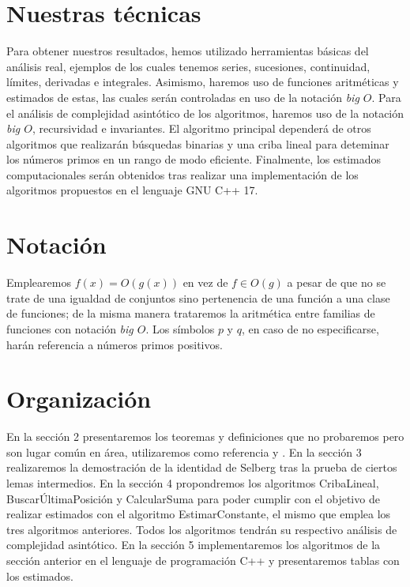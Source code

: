 \section{Nuestras t\'ecnicas}
Para obtener nuestros resultados,
hemos utilizado herramientas b\'asicas del an\'alisis real,
ejemplos de los cuales tenemos series, sucesiones, continuidad,
l\'imites, derivadas e integrales.
Asimismo, haremos uso de funciones aritm\'eticas
y estimados de estas,
las cuales ser\'an controladas en uso de la notaci\'on \textit{big \(O\)}.
Para el an\'alisis de complejidad asint\'otico de los algoritmos,
haremos uso de la notaci\'on \textit{big \(O\)}, recursividad e invariantes.
El algoritmo principal depender\'a de otros algoritmos que realizar\'an
b\'usquedas binarias y una criba lineal para deteminar
los n\'umeros primos en un rango de modo eficiente.
Finalmente, los estimados computacionales ser\'an obtenidos tras realizar una
implementaci\'on de los algoritmos propuestos en el lenguaje GNU C++ 17.

\section{Notaci\'on}
Emplearemos \(f(x) = O(g(x))\) en vez de \(f \in O(g)\)
a pesar de que no se trate de una igualdad de conjuntos sino
pertenencia de una funci\'on a una clase de funciones; 
de la misma manera
trataremos la aritm\'etica entre familias de funciones
con notaci\'on \textit{big \(O\)}.
Los s\'imbolos \(p\) y \(q\), en caso de no especificarse,
har\'an referencia a n\'umeros primos positivos.

\section{Organizaci\'on}
En la secci\'on 2 presentaremos los teoremas y definiciones que no probaremos
pero  son lugar com\'un en \'area,
utilizaremos como referencia \cite{Apostol} y \cite{CLRS}.
En la secci\'on 3 realizaremos la demostraci\'on de la identidad de Selberg
tras la prueba de ciertos lemas intermedios.
En la secci\'on 4 propondremos los algoritmos CribaLineal,
Buscar\'UltimaPosici\'on y CalcularSuma para poder cumplir con
el objetivo de realizar estimados con el algoritmo EstimarConstante,
el mismo que emplea los tres algoritmos anteriores. 
Todos los algoritmos tendr\'an su respectivo an\'alisis de complejidad asint\'otico.
En la secci\'on 5 implementaremos los algoritmos de la secci\'on anterior
en el lenguaje de programaci\'on C++ y presentaremos tablas con los estimados.
